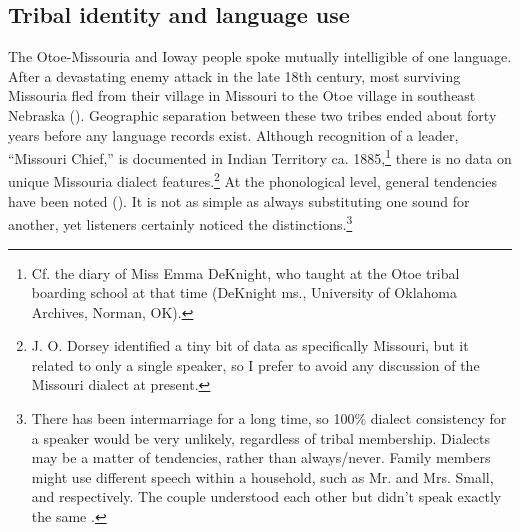 \documentclass[output=paper]{LSP/langsci}
\begin{document}
\subsection{Tribal identity and language use} 	The Otoe-Missouria and Ioway people spoke mutually intelligible  of one language.  After a devastating enemy attack in the late 18th century, most surviving Missouria fled from their village in Missouri to the Otoe village in southeast Nebraska (\citealt{Schweitzer2001}).  Geographic separation between these two tribes ended about forty years before any language records exist.  Although recognition of a leader, ``Missouri Chief,'' is documented in Indian Territory ca. 1885,\footnote{Cf. the diary of Miss Emma DeKnight, who taught at the Otoe tribal boarding school at that time (DeKnight ms., University of Oklahoma Archives, Norman, OK).}  there is no data on unique Missouria dialect features.\footnote{J. O. Dorsey identified a tiny bit of data as specifically Missouri, but it related to only a single speaker, so I prefer to avoid any discussion of the Missouri dialect at present.}  At the phonological level, general tendencies have been noted (). It is not as simple as always substituting one sound for another, yet listeners certainly noticed the distinctions.\footnote{There has been intermarriage for a long time, so 100\% dialect consistency for a speaker would be very unlikely, regardless of tribal membership. Dialects may be a matter of tendencies, rather than always/never. Family members might use different speech within a household, such as Mr. and Mrs. Small,  and  respectively. The couple understood each other but didn't speak exactly the same \citep{Marsh1936}.}	
\end{document}
